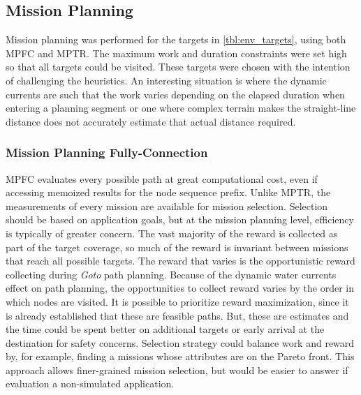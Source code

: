 \documentclass{tamuccthesis}
\begin{document}
\subsection{Mission Planning}

Mission planning was performed for the targets in \ref{tbl:env_targets}, using both MPFC and MPTR. The maximum work and duration constraints were set high so that all targets could be visited. These targets were chosen with the intention of challenging the heuristics. An interesting situation is where the dynamic currents are such that the work varies depending on the elapsed duration when entering a planning segment or one where complex terrain makes the straight-line distance does not accurately estimate that actual distance required. 


\subsubsection{Mission Planning Fully-Connection}

MPFC evaluates every  possible path at great computational cost, even if accessing memoized results for the node sequence prefix. Unlike MPTR, the measurements of every mission are available for mission selection. Selection should be based on application goals, but at the mission planning level, efficiency is typically of greater concern. The vast majority of the reward is collected as part of the target coverage, so much of the reward is invariant between missions that reach all possible targets. The reward that varies is the opportunistic reward collecting during \textit{Goto} path planning. Because of the dynamic water currents effect on path planning, the opportunities to collect reward varies by the order in which nodes are visited. It is possible to prioritize reward maximization, since it is already established that these are feasible paths. But, these are estimates and the time could be spent better on additional targets or early arrival at the destination for safety concerns. Selection strategy could balance work and reward by, for example, finding a missions whose attributes are on the Pareto front. This approach allows finer-grained mission selection, but would be easier to answer if evaluation a non-simulated application. 
\end{document}
